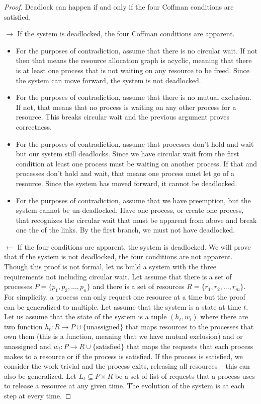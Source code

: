 \begin{proof} Deadlock can happen if and only if the four Coffman conditions are satisfied.

$\rightarrow$ If the system is deadlocked, the four Coffman conditions are apparent.

\begin{itemize}
\item For the purposes of contradiction, assume that there is no circular wait. If not then that means the resource allocation graph is acyclic, meaning that there is at least one process that is not waiting on any resource to be freed. Since the system can move forward, the system is not deadlocked.
\item For the purposes of contradiction, assume that there is no mutual exclusion. If not, that means that no process is waiting on any other process for a resource. This breaks circular wait and the previous argument proves correctness.
\item For the purposes of contradiction, assume that processes don't hold and wait but our system still deadlocks. Since we have circular wait from the first condition at least one process must be waiting on another process. If that and processes don't hold and wait, that means one process must let go of a resource. Since the system has moved forward, it cannot be deadlocked.
\item For the purposes of contradiction, assume that we have preemption, but the system cannot be un-deadlocked. Have one process, or create one process, that recognizes the circular wait that must be apparent from above and break one the of the links. By the first branch, we must not have deadlocked.
\end{itemize}

$\leftarrow$ If the four conditions are apparent, the system is deadlocked.
We will prove that if the system is not deadlocked, the four conditions are not apparent.
Though this proof is not formal, let us build a system with the three requirements not including circular wait.
Let assume that there is a set of processes $P = \{p_1, p_2, ..., p_n\}$ and there is a set of resources $R = \{r_1, r_2, ..., r_m\}$.
For simplicity, a process can only request one resource at a time but the proof can be generalized to multiple.
Let assume that the system is a state at time $t$.
Let us assume that the state of the system is a tuple $(h_t, w_t)$ where there are two function $h_t: R \rightarrow P \cup \{\text{unassigned}\}$ that maps resources to the processes that own them (this is a function, meaning that we have mutual exclusion) and or unassigned and $w_t: P \rightarrow R \cup \{\text{satisfied}\}$ that maps the requests that each process makes to a resource or if the process is satisfied.
If the process is satisfied, we consider the work trivial and the process exits, releasing all resources -- this can also be generalized.
Let $L_t \subseteq P \times R$ be a set of list of requests that a process uses to release a resource at any given time.
The evolution of the system is at each step at every time.


\end{proof}
